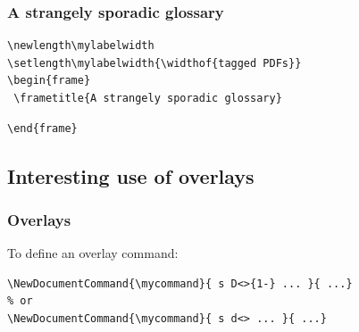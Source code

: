\documentclass{ltx-talk}
\begin{document}
\newlength\mylabelwidth
\setlength{}
\begin{frame*}
  \frametitle{A strangely sporadic glossary}
 \begin{minipage}{.52\textwidth}
 \lstset{aboveskip=0pt,belowskip=0pt}
 \begin{lstlisting}
\newlength\mylabelwidth
\setlength\mylabelwidth{\widthof{tagged PDFs}}
\begin{frame}
 \frametitle{A strangely sporadic glossary}
\end{lstlisting}
%
\begin{lstlisting}
\end{frame}
\end{lstlisting}
 \end{minipage}%
 \begin{minipage}{.48\textwidth}

\end{minipage}
\end{frame*}

\subsection{Interesting use of overlays}

\begin{frame*}
\frametitle{Overlays}
To define an overlay command:
\begin{lstlisting}
\NewDocumentCommand{\mycommand}{ s D<>{1-} ... }{ ...}
% or
\NewDocumentCommand{\mycommand}{ s d<> ... }{ ...}
\end{lstlisting}
\end{frame*}
\end{document}
